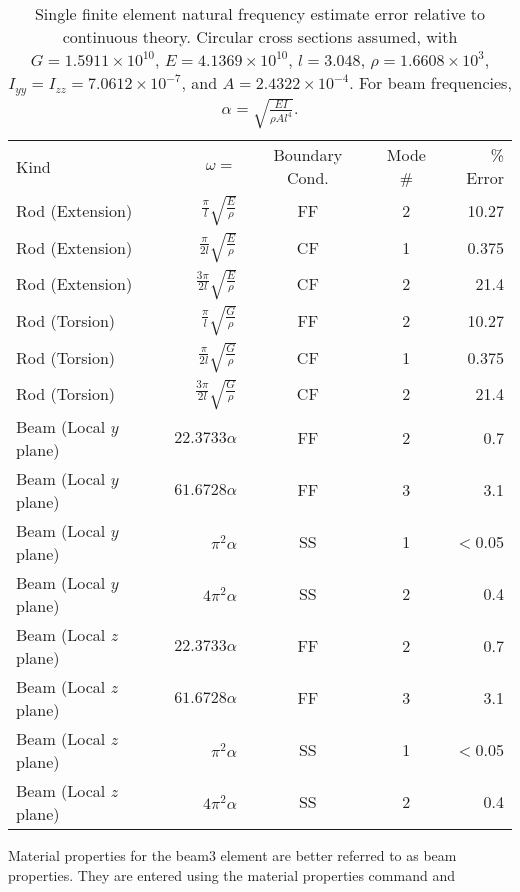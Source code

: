 \documentclass[12pt]{article}
\newcommand*{\command}[1]{\textsf{#1}}
\begin{document}
\begin{table}[htbp]
  \centering
  \begin{tabular}{|l|r|c|c|r|}
    \hline
    Kind&$\omega=$&Boundary Cond.&Mode \# &\% Error\\
    \hhline{|=====|}
    Rod (Extension)&$\frac{\pi}{l}\sqrt{\frac{E}{\rho}}$&FF&2&10.27\\
    \hline
    Rod (Extension)&$\frac{\pi}{2l}\sqrt{\frac{E}{\rho}}$&CF&1&0.375\\
    \hline
    Rod (Extension)&$\frac{3\pi}{2l}\sqrt{\frac{E}{\rho}}$&CF&2&21.4\\
    \hline
    Rod (Torsion)&$\frac{\pi}{l}\sqrt{\frac{G}{\rho}}$&FF&2&10.27\\
    \hline
    Rod (Torsion)&$\frac{\pi}{2l}\sqrt{\frac{G}{\rho}}$&CF&1&0.375\\
    \hline
    Rod (Torsion)&$\frac{3\pi}{2l}\sqrt{\frac{G}{\rho}}$&CF&2&21.4\\
    \hline
    Beam (Local $y$ plane)&$22.3733\alpha$&FF&2&0.7\\
    \hline
    Beam (Local $y$ plane)&$61.6728\alpha$&FF&3&3.1\\
    \hline
    Beam (Local $y$ plane)&$\pi^2\alpha$&SS&1&$<$0.05\\
    \hline
    Beam (Local $y$ plane)&$4\pi^2\alpha$&SS&2&0.4\\
    \hline
    Beam (Local $z$ plane)&$22.3733\alpha$&FF&2&0.7\\
    \hline
    Beam (Local $z$ plane)&$61.6728\alpha$&FF&3&3.1\\
    \hline
    Beam (Local $z$ plane)&$\pi^2\alpha$&SS&1&$<$0.05\\
    \hline
    Beam (Local $z$ plane)&$4\pi^2\alpha$&SS&2&0.4\\
    \hline
  \end{tabular}
\caption{Single finite element natural frequency estimate error relative to continuous theory. Circular cross sections assumed, with $G=1.5911\times 10^{10}$, $E= 4.1369\times 10^{10}$, $l=3.048$, $\rho=1.6608\times 10^3$, $I_{yy}=I_{zz}=7.0612\times 10^{-7}$, and $A=2.4322\times 10^{-4}$. For beam frequencies, $\alpha=\sqrt{\frac{E I}{\rho A l^4}}$.
}
\end{table}
Material properties for the \command{beam3} element are better referred to as beam
properties. They are entered using the material properties command and
\end{document}
